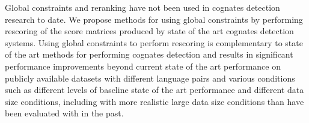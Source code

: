 Global constraints and reranking have not been used in cognates detection research to date. We propose methods for using global constraints by performing rescoring of the score matrices produced by state of the art cognates detection systems. Using global constraints to perform rescoring is complementary to state of the art methods for performing cognates detection and results in significant performance improvements beyond current state of the art performance on publicly available datasets with different language pairs and various conditions such as different levels of baseline state of the art performance and different data size conditions, including with more realistic large data size conditions than have been evaluated with in the past.
